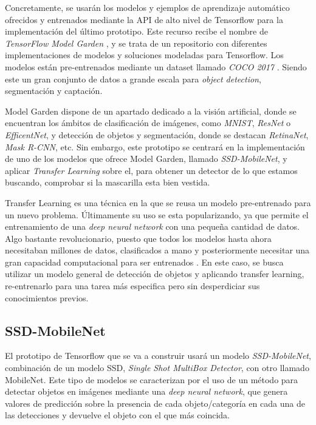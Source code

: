 Concretamente, se usarán los modelos y ejemplos de aprendizaje automático ofrecidos y entrenados mediante la API de alto nivel de Tensorflow para la implementación del último prototipo. Este recurso recibe el nombre de \textit{TensorFlow Model Garden} \cite{modelGarden}, y se trata de un repositorio con diferentes implementaciones de modelos y soluciones modeladas para Tensorflow. Los modelos están pre-entrenados mediante un dataset llamado \textit{COCO 2017} \cite{coco}. Siendo este un gran conjunto de datos a grande escala para \textit{object detection}, segmentación y captación.

Model Garden dispone de un apartado dedicado a la visión artificial, donde se encuentran los ámbitos de clasificación de imágenes, como \textit{MNIST}, \textit{ResNet} o \textit{EfficentNet}, y detección de objetos y segmentación, donde se destacan \textit{RetinaNet}, \textit{Mask R-CNN}, etc. Sin embargo, este prototipo se centrará en la implementación de uno de los modelos que ofrece Model Garden, llamado \textit{SSD-MobileNet}, y aplicar \textit{Transfer Learning} sobre el, para obtener un detector de lo que estamos buscando, comprobar si la mascarilla esta bien vestida.

Transfer Learning es una técnica en la que se reusa un modelo pre-entrenado para un nuevo problema. Últimamente su uso se esta popularizando, ya que permite el entrenamiento de una \textit{deep neural network} con una pequeña cantidad de datos. Algo bastante revolucionario, puesto que todos los modelos hasta ahora necesitaban millones de datos, clasificados a mano y posteriormente necesitar una gran capacidad computacional para ser entrenados \cite{transferLearning}. En este caso, se busca utilizar un modelo general de detección de objetos y aplicando transfer learning, re-entrenarlo para una tarea más especifica pero sin desperdiciar sus conocimientos previos.

\subsection*{SSD-MobileNet}

El prototipo de Tensorflow que se va a construir usará un modelo \textit{SSD-MobileNet}, combinación de un modelo SSD, \textit{Single Shot MultiBox Detector}, con otro llamado MobileNet. Este tipo de modelos se caracterizan por el uso de un método para detectar objetos en imágenes mediante una \textit{deep neural network}, que genera valores de predicción sobre la presencia de cada objeto/categoría en cada una de las detecciones y devuelve el objeto con el que más coincida.

